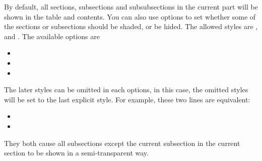\begin{fragileframe}

By default, all sections, subsections and subsubsections in the current part will be shown in the table and contents. You can also use options to set whether some of the sections or subsections should be shaded, or be hided. The allowed styles are ,  and . The available options are 

\begin{itemize}
\item {}
\item {}
\item {}\medskip
\end{itemize}

The later styles can be omitted in each options, in this case, the omitted styles will be set to the last explicit style. For example, these two lines are equivalent:

\begin{itemize}
\item {}
\item {}
\end{itemize}

They both cause all subsections except the current subsection in the
current section to be shown in a semi-transparent way.

\end{fragileframe}

